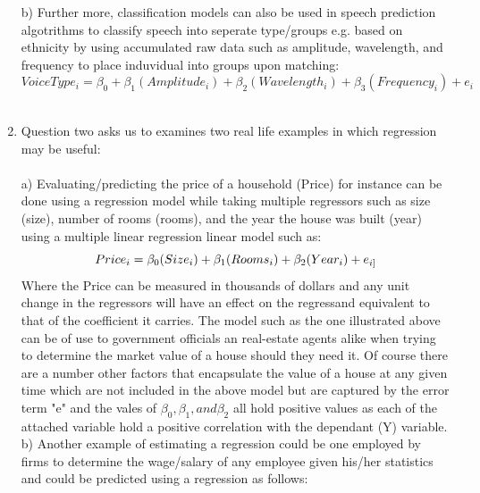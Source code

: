 \documentclass{article}
\begin{document}
\begin{enumerate}
   \hspace{1.27cm\\}
    b) Further more, classification models can also be used in speech prediction algotrithms to classify speech into seperate type/groups e.g. based on ethnicity by using accumulated raw data such as amplitude, wavelength, and frequency to place induvidual into groups upon matching:
    \begin{equation}
        VoiceType_{i} = \beta_{0} + \beta_{1}(Amplitude_{i}) + \beta_{2}(Wavelength_{i}) + \beta_{3}(Frequency_{i}) + e_{i}
    \end{equation}
\hspace{1.27cm}\\
\item Question two asks us to examines two real life examples in which regression may be useful:\\
    \hspace{1.27cm}\\
    a) Evaluating/predicting the price of a household (Price) for instance can be done using a regression model while taking multiple regressors such as size (size), number of rooms (rooms), and the year the house was built (year) using a multiple linear regression linear model such as:\\
    \begin{equation}
  Price_{i} = \beta_{0}(Size_{i}) + \beta_{1}(Rooms_{i}) + \beta_{2}(Year_{i}) + e_{i]}\\
   \end{equation}
   Where the Price can be measured in thousands of dollars and any unit change in the regressors will have an effect on the regressand equivalent to that of the coefficient it carries. The model such as the one illustrated above can be of use to government officials an real-estate agents alike when trying to determine the market value of a house should they need it. Of course there are a number other factors that encapsulate the value of a house at any given time which are not included in the above model but are captured by the error term "e" and the vales of $\beta_{0}, \beta_{1}, and \beta_{2}$ all hold positive values as each of the attached variable hold a positive correlation with the dependant (Y) variable.\\
   \hspace{1.27cm\\}
   b) Another example of estimating a regression could be one employed by firms to determine the wage/salary of any employee given his/her statistics and could be predicted using a regression as follows:
   

\end{enumerate}
\end{document}
